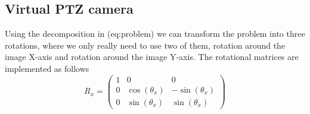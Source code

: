\subsection{Virtual PTZ camera}
	Using the decomposition in (eq:problem) we can transform the problem into three rotations, where we only really need to use two of them, rotation around the image X-axis and rotation around the image Y-axis. The rotational matrices are implemented as follows
	\begin{equation}
		R_x=\begin{pmatrix}1 & 0 & 0 \\
			0 & \cos(\theta_x) & -\sin(\theta_x) \\
			0 & \sin(\theta_x) & \sin(\theta_x)
		\end{pmatrix}
	\end{equation}
